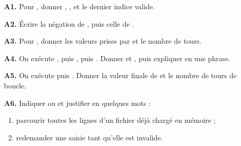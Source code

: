 \documentclass[10pt,a4paper]{article}
\begin{document}
\newpage
{}
\begin{enumerate}
\needspace{22mm}
\item[\textbf{A1.}] Pour , donner , ,  et le dernier indice valide.
\par\vspace{1.2mm}
\needspace{22mm}
\item[\textbf{A2.}] Écrire la négation de , puis celle de .
\par\vspace{1.2mm}
\needspace{22mm}
\item[\textbf{A3.}] Pour , donner les valeurs prises par  et le nombre de tours.
\par\vspace{1.2mm}
\needspace{22mm}
\item[\textbf{A4.}] On exécute , puis , puis . Donner  et , puis expliquer en une phrase.
\par\vspace{1.2mm}
\needspace{22mm}
\item[\textbf{A5.}] On exécute  puis . Donner la valeur finale de  et le nombre de tours de boucle.
\par\vspace{1.2mm}
\needspace{22mm}
\item[\textbf{A6.}] Indiquer  ou  et justifier en quelques mots :
\begin{enumerate}
\item parcourir toutes les lignes d'un fichier déjà chargé en mémoire ;
\item redemander une saisie tant qu'elle est invalide.
\end{enumerate}
\par\vspace{1.2mm}
\end{enumerate}
\needspace{68mm}\par\vspace{3mm}
\end{document}
